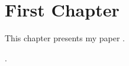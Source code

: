 \documentclass{report}
\begin{document}
    \chapter{First Chapter}
    This chapter presents my paper \cite{whitaker:20:mwf}.

    .

    
    
\end{document}

